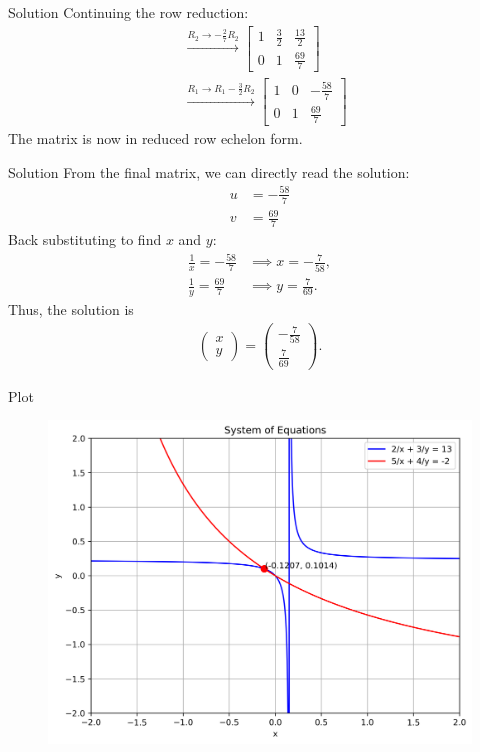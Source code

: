 \documentclass{beamer}
\newcommand{\myvec}[1]{\ensuremath{\begin{pmatrix}#1\end{pmatrix}}}
\begin{document}
	\begin{frame}{Solution}
		Continuing the row reduction:
		\begin{align}
			&\xrightarrow{R_2 \rightarrow -\frac{2}{7}R_2}
			\left[\begin{array}{cc|c}
				1 & \frac{3}{2} & \frac{13}{2} \\
				0 & 1 & \frac{69}{7}
			\end{array}\right] \\
			&\xrightarrow{R_1 \rightarrow R_1 - \frac{3}{2}R_2}
			\left[\begin{array}{cc|c}
				1 & 0 & -\frac{58}{7} \\
				0 & 1 & \frac{69}{7}
			\end{array}\right]
		\end{align}
		The matrix is now in reduced row echelon form.
	\end{frame}
	
	
	\begin{frame}{Solution}
		From the final matrix, we can directly read the solution:
		\begin{align}
			u &= -\frac{58}{7} \\
			v &= \frac{69}{7}
		\end{align}
		Back substituting to find $x$ and $y$:
		\begin{align}
			\frac{1}{x} = -\frac{58}{7} &\implies x = -\frac{7}{58}, \\
			\frac{1}{y} = \frac{69}{7} &\implies y = \frac{7}{69}.
		\end{align}
		Thus, the solution is
		\begin{align}
			\myvec{x \\ y} = \myvec{-\tfrac{7}{58} \\ \tfrac{7}{69}}.
		\end{align}
	\end{frame}
	\begin{frame}{Plot}
		\begin{figure}[H]
			\centering
			\includegraphics[width=1\linewidth]{../figs/equation_plot}
			\caption{}
			\label{fig:equationplot}
		\end{figure}
		
	\end{frame}
\end{document}
